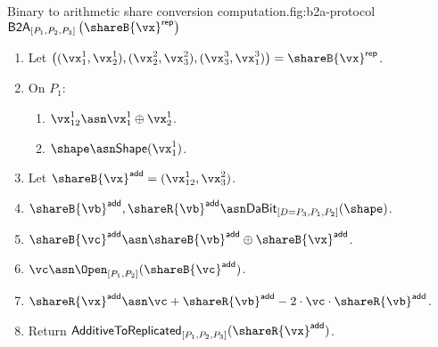 \begin{Boxfig}{Binary to arithmetic share conversion computation.}{fig:b2a-protocol}
  {$\mathsf{B2A}_{[P_1, P_2, P_3]} \left( \shareB{\vx}^\mathsf{rep} \right)$}
  \begin{enumerate}
  \item Let $\left( (\vx_1^1, \vx_2^1), (\vx_2^2, \vx_3^2), (\vx_3^3, \vx_1^3) \right) = \shareB{\vx}^\mathsf{rep}$.
  \item On $P_1$:
  \begin{enumerate}
  \item $\vx^1_{12} \asn \vx_1^1 \oplus \vx_2^1$.
  \item $\shape \asn \mathsf{Shape}(\vx^1_1)$.
  \end{enumerate}
  \item Let $\shareB{\vx}^\mathsf{add} = (\vx^1_{12}, \vx_3^2)$.
  \item $\shareB{\vb}^\mathsf{add}, \shareR{\vb}^\mathsf{add} \asn \textsf{DaBit}_{[D=P_3, P_1, P_2]}(\shape)$.
  \item $\shareB{\vc}^{\mathsf{add}} \asn \shareB{\vb}^\mathsf{add} \oplus \shareB{\vx}^{\mathsf{add}}$.
  \item $\vc \asn \Open_{[P_1, P_2]}(\shareB{\vc}^{\mathsf{add}})$.
  \item $\shareR{\vx}^\mathsf{add} \asn \vc + \shareR{\vb}^{\mathsf{add}} - 2 \cdot \vc \cdot \shareR{\vb}^{\mathsf{add}}$.
  \item Return $\textsf{AdditiveToReplicated}_{[P_1,P_2,P_3]}(\shareR{\vx}^\mathsf{add})$.
\end{enumerate}

\end{Boxfig}

